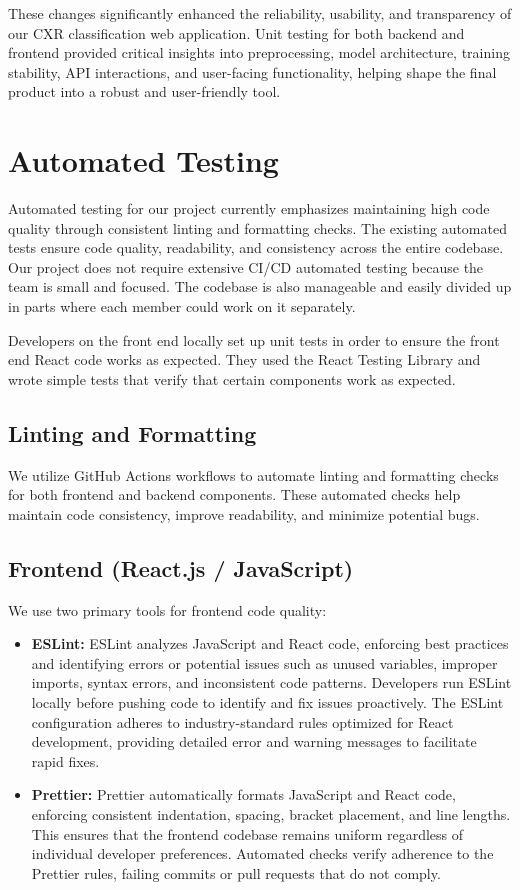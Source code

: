 \documentclass[12pt, titlepage]{article}
\begin{document}
These changes significantly enhanced the reliability, usability, and transparency of our CXR classification web application. Unit testing for both backend and frontend provided critical insights into preprocessing, model architecture, training stability, API interactions, and user-facing functionality, helping shape the final product into a robust and user-friendly tool.


\section{Automated Testing}
Automated testing for our project currently emphasizes maintaining high code quality through consistent linting and formatting checks. The existing automated tests ensure code quality, readability, and consistency across the entire codebase. Our project does not require extensive CI/CD automated testing because the team is small and focused. The codebase is also manageable and easily divided up in parts where each member could work on it separately.

Developers on the front end locally set up unit tests in order to ensure the front end React code works as expected. They used the React Testing Library and wrote simple tests that verify that certain components work as expected.

\subsection{Linting and Formatting}

We utilize GitHub Actions workflows to automate linting and formatting checks for both frontend and backend components. These automated checks help maintain code consistency, improve readability, and minimize potential bugs.

\subsection{Frontend (React.js / JavaScript)}

We use two primary tools for frontend code quality:
\begin{itemize}
\item \textbf{ESLint:} ESLint analyzes JavaScript and React code, enforcing best practices and identifying errors or potential issues such as unused variables, improper imports, syntax errors, and inconsistent code patterns. Developers run ESLint locally before pushing code to identify and fix issues proactively. The ESLint configuration adheres to industry-standard rules optimized for React development, providing detailed error and warning messages to facilitate rapid fixes.
\item \textbf{Prettier:} Prettier automatically formats JavaScript and React code, enforcing consistent indentation, spacing, bracket placement, and line lengths. This ensures that the frontend codebase remains uniform regardless of individual developer preferences. Automated checks verify adherence to the Prettier rules, failing commits or pull requests that do not comply.
\end{itemize}
\end{document}
